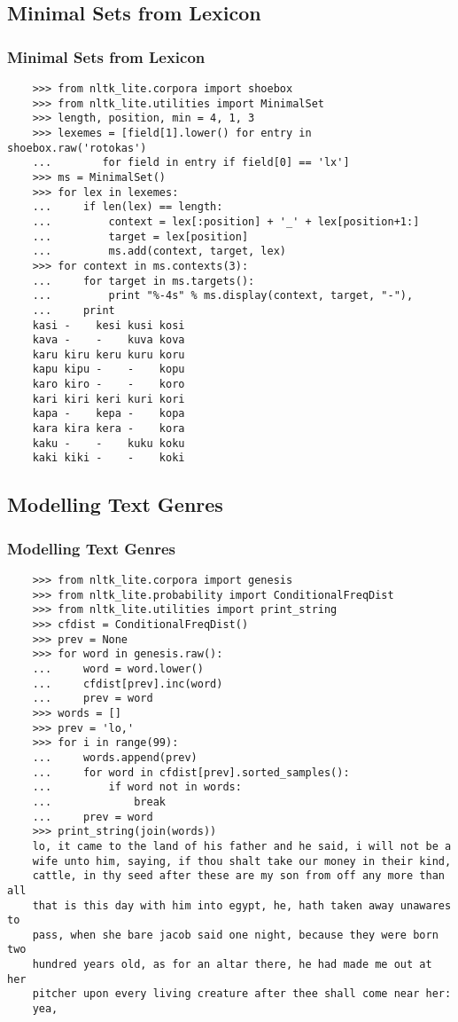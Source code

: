 \documentclass[presentation]{beamer}
\begin{document}
\subsection{Minimal Sets from Lexicon}
\begin{frame}[fragile]
  \frametitle{Minimal Sets from Lexicon}
  \scriptsize
\begin{verbatim}
    >>> from nltk_lite.corpora import shoebox
    >>> from nltk_lite.utilities import MinimalSet
    >>> length, position, min = 4, 1, 3
    >>> lexemes = [field[1].lower() for entry in shoebox.raw('rotokas')
    ...		   for field in entry if field[0] == 'lx']
    >>> ms = MinimalSet()
    >>> for lex in lexemes:
    ...     if len(lex) == length:
    ...         context = lex[:position] + '_' + lex[position+1:]
    ...         target = lex[position]
    ...         ms.add(context, target, lex)
    >>> for context in ms.contexts(3):
    ...     for target in ms.targets():
    ...         print "%-4s" % ms.display(context, target, "-"),
    ...     print
    kasi -    kesi kusi kosi
    kava -    -    kuva kova
    karu kiru keru kuru koru
    kapu kipu -    -    kopu
    karo kiro -    -    koro
    kari kiri keri kuri kori
    kapa -    kepa -    kopa
    kara kira kera -    kora
    kaku -    -    kuku koku
    kaki kiki -    -    koki
\end{verbatim}
\end{frame}


\subsection{Modelling Text Genres}
\begin{frame}[fragile]
  \frametitle{Modelling Text Genres}
  \scriptsize
\begin{verbatim}
    >>> from nltk_lite.corpora import genesis
    >>> from nltk_lite.probability import ConditionalFreqDist
    >>> from nltk_lite.utilities import print_string
    >>> cfdist = ConditionalFreqDist()
    >>> prev = None
    >>> for word in genesis.raw():
    ...     word = word.lower()
    ...     cfdist[prev].inc(word)
    ...     prev = word
    >>> words = []
    >>> prev = 'lo,'
    >>> for i in range(99):
    ...     words.append(prev)
    ...     for word in cfdist[prev].sorted_samples():
    ...         if word not in words:
    ...             break
    ...     prev = word
    >>> print_string(join(words))
    lo, it came to the land of his father and he said, i will not be a
    wife unto him, saying, if thou shalt take our money in their kind,
    cattle, in thy seed after these are my son from off any more than all
    that is this day with him into egypt, he, hath taken away unawares to
    pass, when she bare jacob said one night, because they were born two
    hundred years old, as for an altar there, he had made me out at her
    pitcher upon every living creature after thee shall come near her:
    yea,
\end{verbatim}
\end{frame}
\end{document}

